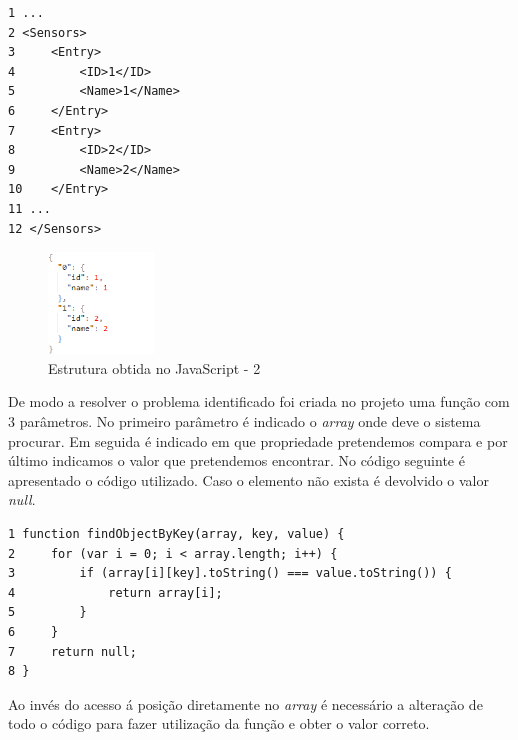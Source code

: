 \begin{verbatim}
1 ...
2 <Sensors>
3     <Entry>
4         <ID>1</ID>
5         <Name>1</Name>
6     </Entry>
7     <Entry>
8         <ID>2</ID>
9         <Name>2</Name>
10    </Entry>
11 ...
12 </Sensors>

\end{verbatim}

\begin{figure}[ht]
\centering
\includegraphics[width=0.25\textwidth]{images/estruct2.png}
\caption{Estrutura obtida no JavaScript - 2}\label{estruct2}
\end{figure}


\par De modo a resolver o problema identificado foi criada no projeto uma função com 3 parâmetros. No primeiro parâmetro é indicado o \textit{array} onde deve o sistema procurar. Em seguida é indicado em que propriedade pretendemos compara e por último indicamos o valor que pretendemos encontrar. No código seguinte é apresentado o código utilizado. Caso o elemento não exista é devolvido o valor \textit{null}.
\begin{verbatim}
1 function findObjectByKey(array, key, value) {
2     for (var i = 0; i < array.length; i++) {
3         if (array[i][key].toString() === value.toString()) {
4             return array[i];
5         }
6     }
7     return null;
8 }
\end{verbatim}

\par Ao invés do acesso á posição diretamente no \textit{array} é necessário a alteração de todo o código para fazer utilização da função e obter o valor correto.

